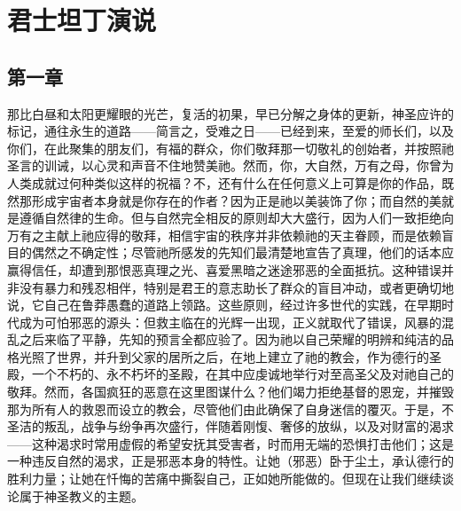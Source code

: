 
\chapter{君士坦丁演说}



\section{第一章 }

那比白昼和太阳更耀眼的光芒，复活的初果，早已分解之身体的更新，神圣应许的标记，通往永生的道路——简言之，受难之日——已经到来，至爱的师长们，以及你们，在此聚集的朋友们，有福的群众，你们敬拜那一切敬礼的创始者，并按照祂圣言的训诫，以心灵和声音不住地赞美祂。然而，你，大自然，万有之母，你曾为人类成就过何种类似这样的祝福？不，还有什么在任何意义上可算是你的作品，既然那形成宇宙者本身就是你存在的作者？因为正是祂以美装饰了你；而自然的美就是遵循自然律的生命。但与自然完全相反的原则却大大盛行，因为人们一致拒绝向万有之主献上祂应得的敬拜，相信宇宙的秩序并非依赖祂的天主眷顾，而是依赖盲目的偶然之不确定性；尽管祂所感发的先知们最清楚地宣告了真理，他们的话本应赢得信任，却遭到那恨恶真理之光、喜爱黑暗之迷途邪恶的全面抵抗。这种错误并非没有暴力和残忍相伴，特别是君王的意志助长了群众的盲目冲动，或者更确切地说，它自己在鲁莽愚蠢的道路上领路。这些原则，经过许多世代的实践，在早期时代成为可怕邪恶的源头：但救主临在的光辉一出现，正义就取代了错误，风暴的混乱之后来临了平静，先知的预言全都应验了。因为祂以自己荣耀的明辨和纯洁的品格光照了世界，并升到父家的居所之后，在地上建立了祂的教会，作为德行的圣殿，一个不朽的、永不朽坏的圣殿，在其中应虔诚地举行对至高圣父及对祂自己的敬拜。然而，各国疯狂的恶意在这里图谋什么？他们竭力拒绝基督的恩宠，并摧毁那为所有人的救恩而设立的教会，尽管他们由此确保了自身迷信的覆灭。于是，不圣洁的叛乱，战争与纷争再次盛行，伴随着刚愎、奢侈的放纵，以及对财富的渴求——这种渴求时常用虚假的希望安抚其受害者，时而用无端的恐惧打击他们；这是一种违反自然的渴求，正是邪恶本身的特性。让她（邪恶）卧于尘土，承认德行的胜利力量；让她在忏悔的苦痛中撕裂自己，正如她所能做的。但现在让我们继续谈论属于神圣教义的主题。\par

